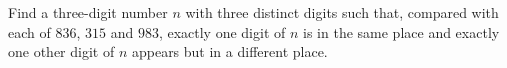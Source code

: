 Find a three-digit number $n$ with three distinct digits such that, compared with each of $836$, $315$ and $983$, exactly one digit of $n$ is in the same place and exactly one other digit of $n$ appears but in a different place.
